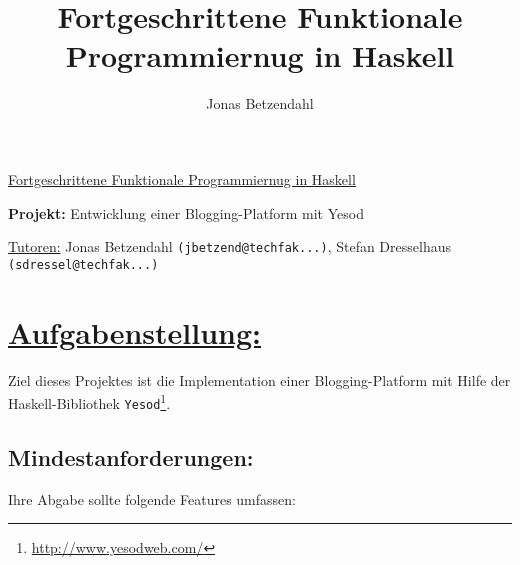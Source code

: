 \documentclass[10pt,a4paper]{article}
\author{Jonas Betzendahl}
\title{Fortgeschrittene Funktionale Programmiernug in Haskell}
\begin{document}
\huge \underline{Fortgeschrittene Funktionale Programmiernug in Haskell}\smallskip

\Large
\begin{center}
\textbf{Projekt:} Entwicklung einer Blogging-Platform mit Yesod\bigskip

\normalsize
\underline{Tutoren:}
Jonas Betzendahl \texttt{(jbetzend@techfak...)},
Stefan Dresselhaus \texttt{(sdressel@techfak...)}
\end{center}
\normalsize

\section*{\underline{Aufgabenstellung:}}

Ziel dieses Projektes ist die Implementation einer Blogging-Platform mit Hilfe der Haskell-Bibliothek
\texttt{Yesod}\footnote{\url{http://www.yesodweb.com/}}.

\subsection*{Mindestanforderungen:}

Ihre Abgabe sollte folgende Features umfassen:
\end{document}
